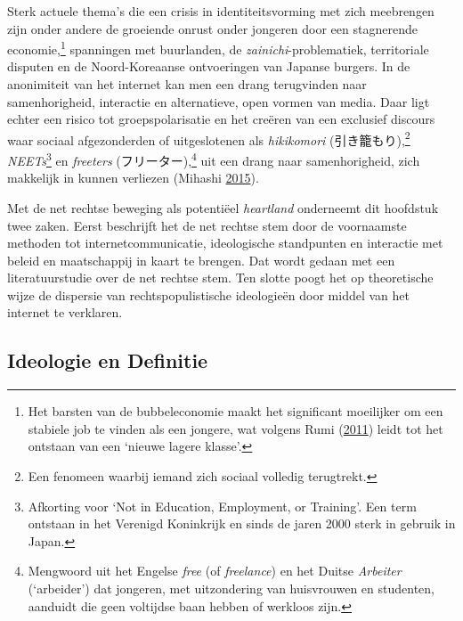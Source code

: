 \documentclass[10.5pt,dutch,]{article}
\begin{document}
Sterk actuele thema's die een crisis in identiteitsvorming met zich
meebrengen zijn onder andere de groeiende onrust onder jongeren door een
stagnerende economie,\footnote{Het barsten van de bubbeleconomie maakt
  het significant moeilijker om een stabiele job te vinden als een
  jongere, wat volgens Rumi
  (\protect\hyperlink{ref-rumiux5fkoreansux5f2011}{2011}) leidt tot het
  ontstaan van een `nieuwe lagere klasse'.} spanningen met buurlanden,
de \emph{zainichi}-problematiek, territoriale disputen en de
Noord-Koreaanse ontvoeringen van Japanse burgers. In de anonimiteit van
het internet kan men een drang terugvinden naar samenhorigheid,
interactie en alternatieve, open vormen van media. Daar ligt echter een
risico tot groepspolarisatie en het creëren van een exclusief discours
waar sociaal afgezonderden of uitgeslotenen als \emph{hikikomori}
(引き籠もり),\footnote{Een fenomeen waarbij iemand zich sociaal volledig
  terugtrekt.} \emph{NEETs}\footnote{Afkorting voor `Not in Education,
  Employment, or Training'. Een term ontstaan in het Verenigd Koninkrijk
  en sinds de jaren 2000 sterk in gebruik in Japan.} en \emph{freeters}
(フリーター),\footnote{Mengwoord uit het Engelse \emph{free} (of
  \emph{freelance}) en het Duitse \emph{Arbeiter} (`arbeider') dat
  jongeren, met uitzondering van huisvrouwen en studenten, aanduidt die
  geen voltijdse baan hebben of werkloos zijn.} uit een drang naar
samenhorigheid, zich makkelijk in kunnen verliezen (Mihashi
\protect\hyperlink{ref-izumiux5fmihashiux5fconfessionsux5f2015}{2015}).

Met de net rechtse beweging als potentiëel \emph{heartland} onderneemt
dit hoofdstuk twee zaken. Eerst beschrijft het de net rechtse stem door
de voornaamste methoden tot internetcommunicatie, ideologische
standpunten en interactie met beleid en maatschappij in kaart te
brengen. Dat wordt gedaan met een literatuurstudie over de net rechtse
stem. Ten slotte poogt het op theoretische wijze de dispersie van
rechtspopulistische ideologieën door middel van het internet te
verklaren.

\subsection{Ideologie en Definitie}\label{ideologie-en-definitie}
\end{document}

